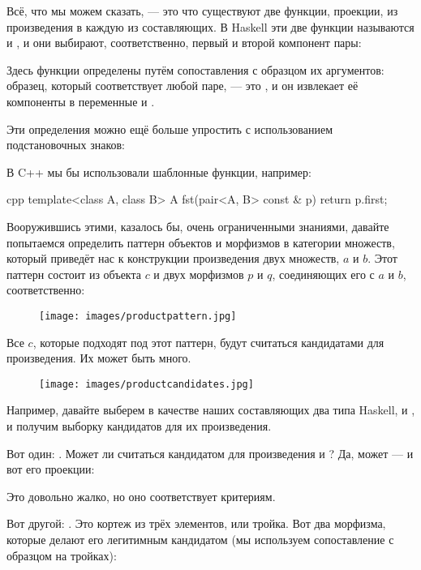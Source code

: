 Всё, что мы можем сказать, --- это что существуют две функции, проекции, из
произведения в каждую из составляющих. В Haskell эти две функции
называются  и , и они выбирают, соответственно,
первый и второй компонент пары:


Здесь функции определены путём сопоставления с образцом их аргументов:
образец, который соответствует любой паре, --- это , и он извлекает её
компоненты в переменные  и .

Эти определения можно ещё больше упростить с использованием
подстановочных знаков:

В C++ мы бы использовали шаблонные функции, например:

\begin{snip}{cpp}
template<class A, class B> A
fst(pair<A, B> const & p) {
    return p.first;
}
\end{snip}
Вооружившись этими, казалось бы, очень ограниченными знаниями, давайте попытаемся определить
паттерн объектов и морфизмов в категории множеств, который
приведёт нас к конструкции произведения двух множеств, $a$ и
$b$. Этот паттерн состоит из объекта $c$ и двух морфизмов
$p$ и $q$, соединяющих его с $a$ и $b$,
соответственно:


\begin{figure}[H]
  \centering
  \texttt{[image: images/productpattern.jpg]}
\end{figure}

\noindent
Все $c$, которые подходят под этот паттерн, будут считаться кандидатами для
произведения. Их может быть много.

\begin{figure}[H]
  \centering
  \texttt{[image: images/productcandidates.jpg]}
\end{figure}

\noindent
Например, давайте выберем в качестве наших составляющих два типа Haskell,
 и , и получим выборку кандидатов для
их произведения.

Вот один: . Может ли  считаться кандидатом для
произведения  и ? Да, может --- и вот
его проекции:

Это довольно жалко, но оно соответствует критериям.

Вот другой: . Это кортеж из трёх
элементов, или тройка. Вот два морфизма, которые делают его легитимным
кандидатом (мы используем сопоставление с образцом на тройках):

